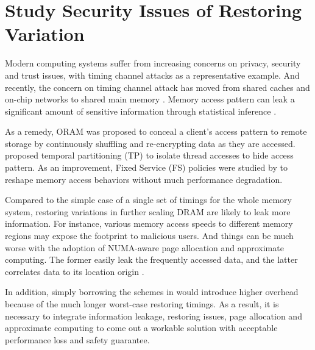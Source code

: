
\section{Study Security Issues of Restoring Variation} \label{work:security}
Modern computing systems suffer from increasing concerns on privacy, security and trust issues, with timing channel attacks as a representative example.
And recently, the concern on timing channel attack has moved from shared caches \cite{BSDCan05:cache_fun, ISCA07:cache_channel, HASP13:cache} and on-chip networks \cite{NOCS12:noc_channel, ISCA13:surfnoc} to shared main memory \cite{CCS13:oram, HPCA14:channel, MICRO15:fs}.
Memory access pattern can leak a significant amount of sensitive information through statistical inference \cite{CCS13:oram}.

As a remedy, ORAM \cite{CCS13:oram} was proposed to conceal a client's access pattern to remote storage by continuously shuffling and re-encrypting data as they are accessed.
 proposed temporal partitioning (TP) to isolate thread accesses to hide access pattern. As an improvement, Fixed Service (FS) policies were studied by \cite{MICRO15:fs} to reshape memory access behaviors without much performance degradation.

Compared to the simple case of a single set of timings for the whole memory system, restoring variations in further scaling DRAM are likely to leak more information. For instance, various memory access speeds to different memory regions may expose the footprint to malicious users. And things can be much worse with the adoption of NUMA-aware page allocation and approximate computing. The former easily leak the frequently accessed data, and the latter correlates data to its location origin \cite{ISCA15:prob}. 

In addition, simply borrowing the schemes in \cite{HPCA14:channel, MICRO15:fs} would introduce higher overhead because of the much longer worst-case restoring timings.
As a result, it is necessary to integrate information leakage, restoring issues, page allocation and approximate computing to come out a workable solution with acceptable performance loss and safety guarantee.



